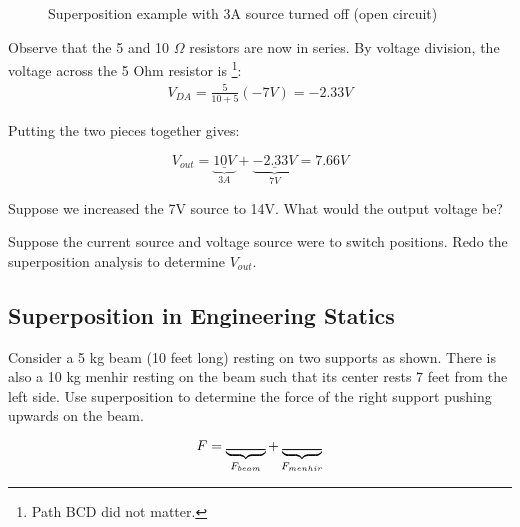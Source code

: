\begin{figure}[H]
\begin{center}
\caption{Superposition example with 3A source turned off (open circuit)}
\end{center}
\end{figure}

Observe that the 5 and 10 $\Omega$ resistors are now in series. By voltage division, the voltage across the 5 Ohm resistor is \footnote{Path BCD did not matter.}:
\begin{align*}
V_{DA}=\frac{5}{10+5}(-7V)=-2.33V
\end{align*}

Putting the two pieces together gives:

\[
V_{out}=\underbrace{\underline{10V}}_{3A}+\underbrace{\underline{-2.33V}}_{7V} = 7.66V
\]

\begin{blevel}
Suppose we increased the 7V source to 14V. What would the output voltage be?
\end{blevel}

\begin{clevel}
Suppose the current source and voltage source were to switch positions. Redo the superposition analysis to determine $V_{out}$.
\end{clevel}

\subsection{Superposition in Engineering Statics}
Consider a 5 kg beam (10 feet long) resting on two supports as shown. There is also a 10 kg menhir resting on the beam such that its center rests 7 feet from the left side. Use superposition to determine the force of the right support pushing upwards on the beam.
\par
\[
F=\underbrace{\rule{1 cm}{.25 mm}}_{F_{beam}}+\underbrace{\rule{1 cm}{.25 mm}}_{F_{menhir}}
\]


